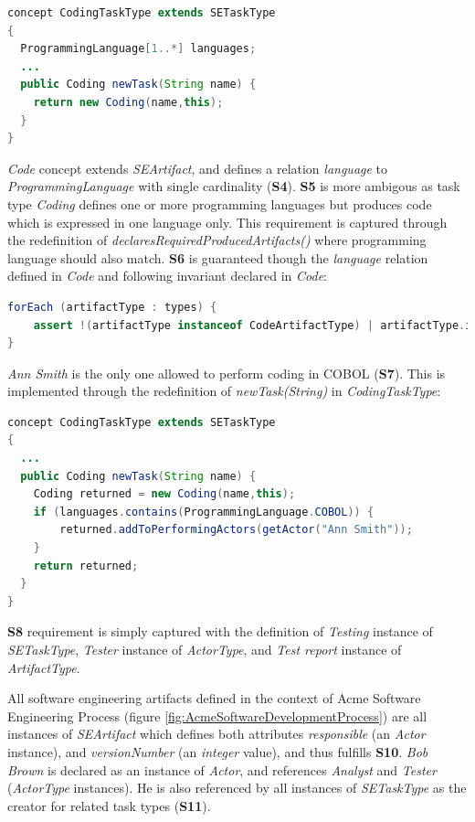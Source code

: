 \begin{lstlisting}[breaklines=true, language=java, basicstyle=\ttfamily\scriptsize, mathescape=true]
concept CodingTaskType extends SETaskType 
{
  ProgrammingLanguage[1..*] languages;
  ...
  public Coding newTask(String name) { 
    return new Coding(name,this); 
  }
}    
\end{lstlisting}

\textit{Code} concept extends \textit{SEArtifact}, and defines a relation \textit{language} to \textit{ProgrammingLanguage} with single cardinality (\textbf{S4}). \textbf{S5} is more ambigous as task type \textit{Coding} defines one or more programming languages but produces code which is expressed in one language only. This requirement is captured through the redefinition of \textit{declaresRequiredProducedArtifacts()} where programming language should also match.  \textbf{S6} is guaranteed though the \textit{language} relation defined in \textit{Code} and following invariant declared in \textit{Code}:  

\begin{lstlisting}[breaklines=true, language=java, basicstyle=\ttfamily\scriptsize, mathescape=true]
forEach (artifactType : types) {
    assert !(artifactType instanceof CodeArtifactType) | artifactType.implements(languages)
}
\end{lstlisting}

\textit{Ann Smith} is the only one allowed to perform coding in COBOL (\textbf{S7}). This is implemented through the redefinition of \textit{newTask(String)} in \textit{CodingTaskType}:

\begin{lstlisting}[breaklines=true, language=java, basicstyle=\ttfamily\scriptsize, mathescape=true]
concept CodingTaskType extends SETaskType 
{
  ...
  public Coding newTask(String name) {
    Coding returned = new Coding(name,this); 
    if (languages.contains(ProgrammingLanguage.COBOL)) {
        returned.addToPerformingActors(getActor("Ann Smith"));
    }
    return returned;
  }
}    
\end{lstlisting}

\textbf{S8} requirement is simply captured with the definition of \textit{Testing} instance of \textit{SETaskType}, \textit{Tester} instance of \textit{ActorType}, and \textit{Test report} instance of \textit{ArtifactType}.

All software engineering artifacts defined in the context of Acme Software Engineering Process (figure \ref{fig:AcmeSoftwareDevelopmentProcess}) are all instances of \textit{SEArtifact} which defines both attributes \textit{responsible} (an \textit{Actor} instance), and \textit{versionNumber} (an \textit{integer} value), and thus fulfills \textbf{S10}. \textit{Bob Brown} is declared as an instance of \textit{Actor}, and references \textit{Analyst} and \textit{Tester} (\textit{ActorType} instances). He is also referenced by all instances of \textit{SETaskType} as the creator for related task types (\textbf{S11}).

